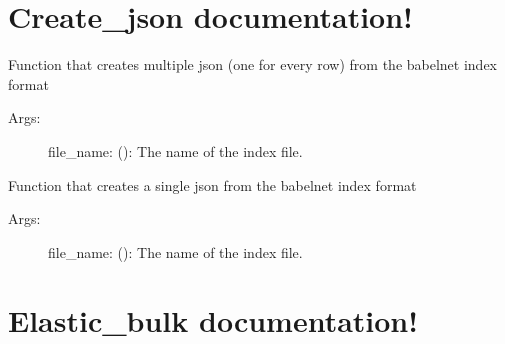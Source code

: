 \documentclass[letterpaper,10pt,english]{sphinxmanual}
\begin{document}
\chapter{Create\_json documentation!}
\label{\detokenize{create_json:module-create_json}}\label{\detokenize{create_json:create-json-documentation}}\label{\detokenize{create_json::doc}}\label{\detokenize{create_json:module-create_json}}

\begin{fulllineitems}
\label{\detokenize{create_json:create_json.multiple_json}}
Function that creates multiple json (one for every row) from the babelnet index format
\begin{description}
\item[{Args:}] \leavevmode
file\_name: (): The name of the index file.

\end{description}

\end{fulllineitems}


\begin{fulllineitems}
\label{\detokenize{create_json:create_json.single_json}}
Function that creates a single json from the babelnet index format
\begin{description}
\item[{Args:}] \leavevmode
file\_name: (): The name of the index file.

\end{description}

\end{fulllineitems}



\chapter{Elastic\_bulk documentation!}
\label{\detokenize{elastic_bulk:module-elastic_bulk}}\label{\detokenize{elastic_bulk:elastic-bulk-documentation}}\label{\detokenize{elastic_bulk::doc}}\label{\detokenize{elastic_bulk:module-elastic_bulk}}
\end{document}
